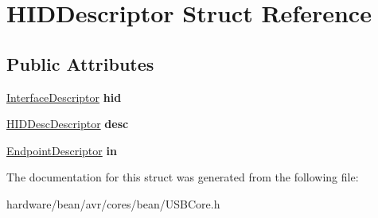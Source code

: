 \hypertarget{struct_h_i_d_descriptor}{}\section{H\+I\+D\+Descriptor Struct Reference}
\label{struct_h_i_d_descriptor}
\subsection*{Public Attributes}
\begin{DoxyCompactItemize}
\item 
\hypertarget{struct_h_i_d_descriptor_ae72a473536f32b7e6cab5537ea9941e0}{}\hyperlink{struct_interface_descriptor}{Interface\+Descriptor} {\bfseries hid}\label{struct_h_i_d_descriptor_ae72a473536f32b7e6cab5537ea9941e0}

\item 
\hypertarget{struct_h_i_d_descriptor_a3e8631944ed908ad2f8b36685b689a87}{}\hyperlink{struct_h_i_d_desc_descriptor}{H\+I\+D\+Desc\+Descriptor} {\bfseries desc}\label{struct_h_i_d_descriptor_a3e8631944ed908ad2f8b36685b689a87}

\item 
\hypertarget{struct_h_i_d_descriptor_acc38a209fa31af987724b82b48a669ff}{}\hyperlink{struct_endpoint_descriptor}{Endpoint\+Descriptor} {\bfseries in}\label{struct_h_i_d_descriptor_acc38a209fa31af987724b82b48a669ff}

\end{DoxyCompactItemize}


The documentation for this struct was generated from the following file\+:\begin{DoxyCompactItemize}
\item 
hardware/bean/avr/cores/bean/U\+S\+B\+Core.\+h\end{DoxyCompactItemize}

